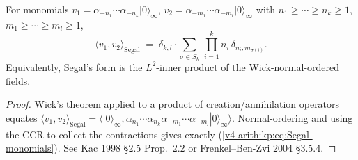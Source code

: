 \begin{proposition}
\label{v4-arith:kp:prop:Segal-monomials}
For monomials
\(v_{1}=\alpha_{-n_{1}}\cdots\alpha_{-n_{k}}|0\rangle_{\infty}\),
\(v_{2}=\alpha_{-m_{1}}\cdots\alpha_{-m_{l}}|0\rangle_{\infty}\)
with \(n_{1}\geq\cdots\geq n_{k}\geq 1\),
\(m_{1}\geq\cdots\geq m_{l}\geq 1\),
\begin{equation}
\label{v4-arith:kp:eq:Segal-monomials}
\langle v_{1},v_{2}\rangle_{\mathrm{Segal}}
\;=\;
\delta_{k,l}\cdot\sum_{\sigma\in S_{k}}\,
\prod_{i=1}^{k}n_{i}\,\delta_{n_{i},m_{\sigma(i)}}.
\end{equation}
Equivalently, Segal's form is the \(L^{2}\)-inner product of the
Wick-normal-ordered fields.
\end{proposition}

\begin{proof}
Wick's theorem applied to a product of creation/annihilation
operators equates
\(\langle v_{1},v_{2}\rangle_{\mathrm{Segal}}
=\langle|0\rangle_{\infty},\alpha_{n_{1}}\cdots\alpha_{n_{k}}
\alpha_{-m_{1}}\cdots\alpha_{-m_{l}}|0\rangle_{\infty}\rangle\).
Normal-ordering and using the CCR to collect the contractions
gives exactly
(\ref{v4-arith:kp:eq:Segal-monomials}). See Kac 1998 \S2.5
Prop.~2.2 or Frenkel--Ben-Zvi 2004 \S3.5.4.
\end{proof}

